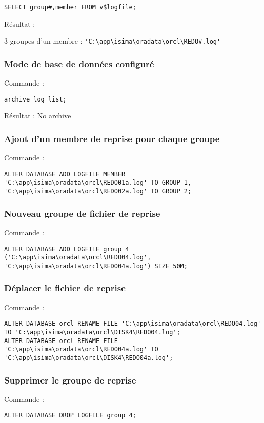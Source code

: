 \begin{verbatim}
SELECT group#,member FROM v$logfile;
\end{verbatim}

Résultat : 

3 groupes d'un membre :  \verb|'C:\app\isima\oradata\orcl\REDO#.log'|

\subsubsection{Mode de base de données configuré}

Commande :
\begin{verbatim}
archive log list;
\end{verbatim}

Résultat : No archive

\subsubsection{Ajout d'un membre de reprise pour chaque groupe}

Commande : 
\begin{verbatim}
ALTER DATABASE ADD LOGFILE MEMBER 'C:\app\isima\oradata\orcl\REDO01a.log' TO GROUP 1, 'C:\app\isima\oradata\orcl\REDO02a.log' TO GROUP 2;
\end{verbatim}

\subsubsection{Nouveau groupe de fichier de reprise}

Commande : 
\begin{verbatim}
ALTER DATABASE ADD LOGFILE group 4 ('C:\app\isima\oradata\orcl\REDO04.log', 'C:\app\isima\oradata\orcl\REDO04a.log') SIZE 50M;
\end{verbatim}

\subsubsection{Déplacer le fichier de reprise}

Commande : 
\begin{verbatim}
ALTER DATABASE orcl RENAME FILE 'C:\app\isima\oradata\orcl\REDO04.log' TO 'C:\app\isima\oradata\orcl\DISK4\REDO04.log';
ALTER DATABASE orcl RENAME FILE 'C:\app\isima\oradata\orcl\REDO04a.log' TO 'C:\app\isima\oradata\orcl\DISK4\REDO04a.log';
\end{verbatim}

\subsubsection{Supprimer le groupe de reprise}

Commande : 
\begin{verbatim}
ALTER DATABASE DROP LOGFILE group 4;
\end{verbatim}